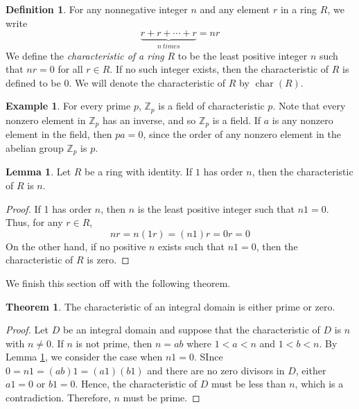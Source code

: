 \documentclass[11pt]{book}
\theoremstyle{definition}\newtheorem{definition}[subsection]{Definition}
\theoremstyle{definition}\newtheorem{example}[subsection]{Example}
\theoremstyle{definition}\newtheorem{notation}[subsection]{Notation}
\theoremstyle{definition}\newtheorem{remark}[subsection]{Remark}
\theoremstyle{theorem}\newtheorem{theorem}[subsection]{Theorem}
\theoremstyle{theorem}\newtheorem{lemma}[subsection]{Lemma}
\theoremstyle{theorem}\newtheorem{proposition}[subsection]{Proposition}
\theoremstyle{theorem}\newtheorem{corollary}[subsection]{Corollary}
\newcommand{\Z}{\mathbb{Z}}
\DeclareMathOperator{\Char}{char}
\begin{document}
\begin{definition}\label{definition:1.2.6}
    For any nonnegative integer $n$ and any element $r$ in a ring $R$, we write
    \begin{equation*}
        \underbrace{r + r + \cdots + r}_{n \ times} = nr
    \end{equation*}
    We define the \emph{characteristic of a ring} $R$ to be the least positive integer $n$ such that $nr = 0$ for all $r \in R$. If no such integer exists, then the characteristic of $R$ is defined to be 0. We will denote the characteristic of $R$ by $\Char(R)$.
\end{definition}

\begin{example}\label{example:1.2.7}
    For every prime $p$, $\Z_p$ is a field of characteristic $p$. Note that every nonzero element in $\Z_p$ has an inverse, and so $\Z_p$ is a field. If $a$ is any nonzero element in the field, then $pa = 0$, since the order of any nonzero element in the abelian group $\Z_p$ is $p$.
\end{example}

\begin{lemma}\label{lemma:1.2.8}
    Let $R$ be a ring with identity. If $1$ has order $n$, then the characteristic of $R$ is $n$.
\end{lemma}

\begin{proof}
    If 1 has order $n$, then $n$ is the least positive integer such that $n1 = 0$. Thus, for any $r \in R$,
    \begin{equation*}
        nr = n(1r) = (n1)r = 0r = 0
    \end{equation*}
    On the other hand, if no positive $n$ exists such that $n1 = 0$, then the characteristic of $R$ is zero.
\end{proof}

We finish this section off with the following theorem.

\begin{theorem}\label{theorem:1.2.9}
    The characteristic of an integral domain is either prime or zero.
\end{theorem}

\begin{proof}
    Let $D$ be an integral domain and suppose that the characteristic of $D$ is $n$ with $n \neq 0$. If $n$ is not prime, then $n = ab$ where $1 < a < n$ and $1 < b < n$. By Lemma \ref{lemma:1.2.8}, we consider the case when $n1 = 0$. SInce $0 = n1 = (ab)1 = (a1)(b1)$ and there are no zero divisors in $D$, either $a1 = 0$ or $b1 = 0$. Hence, the characteristic of $D$ must be less than $n$, which is a contradiction. Therefore, $n$ must be prime.
\end{proof}
\end{document}
